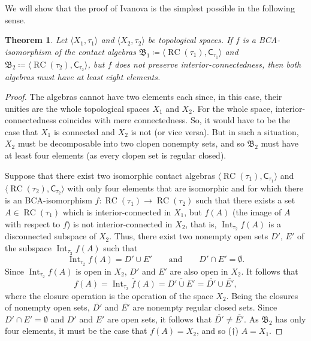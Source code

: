 \documentclass[a4paper,12pt]{amsart}
\numberwithin{equation}{section}
\newtheorem{theorem}{Theorem}[section]
\theoremstyle{mytheoremstyle}
\DeclareMathOperator{\Int}{Int}
\DeclareMathOperator{\RCvtex}{RC}
\begin{document}
We will show that the proof of Ivanova is the simplest possible in the
following sense.
%
\begin{sloppypar}
\begin{theorem}%
\label{th:8-elements}
Let $  \langle X_{1},\tau _{1}  \rangle $ and
$  \langle X_{2},\tau _{2}  \rangle $ be topological spaces. If
$f$ is a BCA-isomorphism of the contact algebras
$\mathfrak{B}_1\coloneqq  \langle \RCvtex (\tau _{1}),\mathord{\mathrel{\mathsf{C}}_{\tau _{1}}}
  \rangle $ and
$\mathfrak{B}_2\coloneqq  \langle \RCvtex (\tau _{2}),\mathord{\mathrel{\mathsf{C}}_{\tau _{2}}}
  \rangle $, but $f$ does not preserve interior-connectedness, then
both algebras must have at least eight elements.
\end{theorem}
\end{sloppypar}
%
\begin{proof}
The algebras cannot have two elements each since, in this case, their unities
are the whole topological spaces $X_{1}$ and $X_{2}$. For the whole space,
interior-connectedness coincides with mere connectedness. So, it would
have to be the case that $X_{1}$ is connected and $X_{2}$ is not (or vice
versa). But in such a situation, $X_{2}$ must be decomposable into two
clopen nonempty sets, and so $\mathfrak{B}_{2}$ must have at least four
elements (as every clopen set is regular closed).

Suppose that there exist two isomorphic contact algebras
$\langle \RCvtex (\tau _{1}),\mathord{\mathrel{\mathsf{C}}_{\tau _{1}}}
  \rangle $ and
$\langle \RCvtex (\tau _{2}),\mathord{\mathrel{\mathsf{C}}_{\tau _{2}}}
  \rangle $ with only four elements that
are isomorphic and for which there is an BCA-isomorphism
$f\colon\RCvtex (\tau _{1}) \to \RCvtex (\tau _{2})$ such that there exists a set $A \in \RCvtex (\tau _{1})$ which
is interior-connected in $X_{1}$, but
$f(A)$ (the image of $A$ with respect to $f$) is not interior-connected
in $X_{2}$, that is,
$\Int _{\tau _{2}}f(A)$ is a disconnected subspace of $X_{2}$.
Thus, there exist two nonempty open sets $D'$, $E'$ of the subspace
$\Int _{\tau _{2}} f(A)$ such that
%
\begin{equation*}
\Int _{\tau _{2}} f(A) = D' \cup E' \qquad \text{and} \qquad D' \cap E'
= \emptyset .
\end{equation*}
%
Since $\Int _{\tau _{2}} f(A)$ is open in $X_{2}$, $D'$ and $E'$ are also
open in $X_{2}$. It follows that
%
\begin{equation*}
f(A) = \overline{\Int _{\tau _{2}}f(A)} = \overline{D' \cup E'} =
\overline{D'} \cup \overline{E'},
\end{equation*}
%
where the closure operation is the operation of the space $X_{2}$. Being
the closures of nonempty open sets, $\overline{D'}$ and
$\overline{E'}$ are nonempty regular closed sets. Since
$D' \cap E' = \emptyset $ and $D'$ and $E'$ are open sets, it follows that
$\overline{D'} \neq \overline{E'}$. As $\mathfrak{B}_{2}$ has only four
elements, it must be the case that $f(A)=X_{2}$, and so ($\dagger $)
$A=X_{1}$.


\end{proof}
\end{document}
